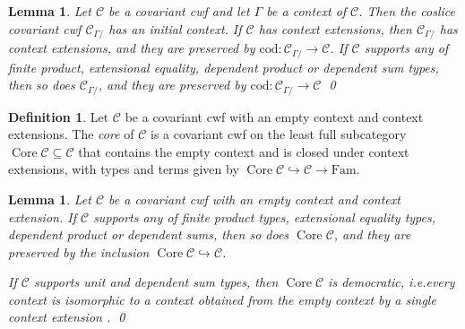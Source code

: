 \documentclass[a4paper]{article}
\newtheorem{lemma}[theorem]{Lemma}
\theoremstyle{remark}
\theoremstyle{definition}
\newtheorem{definition}[theorem]{Definition}
\begin{document}
\begin{lemma}
  \label{lem:coslice-cwf}
  Let $\mathcal{C}$ be a covariant cwf and let $\Gamma$ be a context of $\mathcal{C}$.
  Then the coslice covariant cwf $\mathcal{C}_{\Gamma /}$ has an initial context.
  If $\mathcal{C}$ has context extensions, then $\mathcal{C}_{\Gamma /}$ has context extensions, and they are preserved by $\mathrm{cod} : \mathcal{C}_{\Gamma /} \rightarrow \mathcal{C}$.
  If $\mathcal{C}$ supports any of finite product, extensional equality, dependent product or dependent sum types, then so does $\mathcal{C}_{\Gamma /}$, and they are preserved by $\mathrm{cod} : \mathcal{C}_{\Gamma /} \rightarrow \mathcal{C}$
  \qed
\end{lemma}

\begin{definition}
  Let $\mathcal{C}$ be a covariant cwf with an empty context and context extensions.
  The \emph{core} of $\mathcal{C}$ is a covariant cwf on the least full subcategory $\operatorname{Core} \mathcal{C} \subseteq \mathcal{C}$ that contains the empty context and is closed under context extensions, with types and terms given by $\operatorname{Core} \mathcal{C} \hookrightarrow \mathcal{C} \rightarrow \mathrm{Fam}$.
\end{definition}

\begin{lemma}
  \label{lem:core-cwf}
  Let $\mathcal{C}$ be a covariant cwf with an empty context and context extension.
  If $\mathcal{C}$ supports any of finite product types, extensional equality types, dependent product or dependent sums, then so does $\operatorname{Core} \mathcal{C}$, and they are preserved by the inclusion $\operatorname{Core} \mathcal{C} \hookrightarrow \mathcal{C}$.

  If $\mathcal{C}$ supports unit and dependent sum types, then $\operatorname{Core} \mathcal{C}$ is democratic, i.e.\@ every context is isomorphic to a context obtained from the empty context by a single context extension \citep{biequivalence-lcc-cwf}.
  \qed
\end{lemma}
\end{document}
